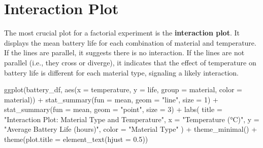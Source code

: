 \documentclass[
  letterpaper,
]{scrbook}
\newenvironment{Shaded}{\begin{snugshade}}{\end{snugshade}}
\newcommand{\AttributeTok}[1]{\textcolor[rgb]{0.40,0.45,0.13}{#1}}
\newcommand{\DecValTok}[1]{\textcolor[rgb]{0.68,0.00,0.00}{#1}}
\newcommand{\FloatTok}[1]{\textcolor[rgb]{0.68,0.00,0.00}{#1}}
\newcommand{\FunctionTok}[1]{\textcolor[rgb]{0.28,0.35,0.67}{#1}}
\newcommand{\NormalTok}[1]{\textcolor[rgb]{0.00,0.23,0.31}{#1}}
\newcommand{\SpecialCharTok}[1]{\textcolor[rgb]{0.37,0.37,0.37}{#1}}
\newcommand{\StringTok}[1]{\textcolor[rgb]{0.13,0.47,0.30}{#1}}
\begin{document}
\section{Interaction Plot}\label{interaction-plot}

The most crucial plot for a factorial experiment is the
\textbf{interaction plot}. It displays the mean battery life for each
combination of material and temperature. If the lines are parallel, it
suggests there is no interaction. If the lines are not parallel (i.e.,
they cross or diverge), it indicates that the effect of temperature on
battery life is different for each material type, signaling a likely
interaction.

\begin{Shaded}
\begin{Highlighting}[]
\FunctionTok{ggplot}\NormalTok{(battery\_df, }\FunctionTok{aes}\NormalTok{(}\AttributeTok{x =}\NormalTok{ temperature, }\AttributeTok{y =}\NormalTok{ life, }\AttributeTok{group =}\NormalTok{ material, }\AttributeTok{color =}\NormalTok{ material)) }\SpecialCharTok{+}
  \FunctionTok{stat\_summary}\NormalTok{(}\AttributeTok{fun =}\NormalTok{ mean, }\AttributeTok{geom =} \StringTok{"line"}\NormalTok{, }\AttributeTok{size =} \DecValTok{1}\NormalTok{) }\SpecialCharTok{+}
  \FunctionTok{stat\_summary}\NormalTok{(}\AttributeTok{fun =}\NormalTok{ mean, }\AttributeTok{geom =} \StringTok{"point"}\NormalTok{, }\AttributeTok{size =} \DecValTok{3}\NormalTok{) }\SpecialCharTok{+}
  \FunctionTok{labs}\NormalTok{(}
    \AttributeTok{title =} \StringTok{"Interaction Plot: Material Type and Temperature"}\NormalTok{,}
    \AttributeTok{x =} \StringTok{"Temperature (°C)"}\NormalTok{,}
    \AttributeTok{y =} \StringTok{"Average Battery Life (hours)"}\NormalTok{,}
    \AttributeTok{color =} \StringTok{"Material Type"}
\NormalTok{  ) }\SpecialCharTok{+}
  \FunctionTok{theme\_minimal}\NormalTok{() }\SpecialCharTok{+}
  \FunctionTok{theme}\NormalTok{(}\AttributeTok{plot.title =} \FunctionTok{element\_text}\NormalTok{(}\AttributeTok{hjust =} \FloatTok{0.5}\NormalTok{))}
\end{Highlighting}
\end{Shaded}
\end{document}
